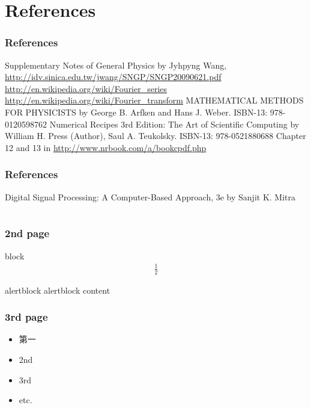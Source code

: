 \documentclass{beamer}
\begin{document}
\section{References}
\begin{frame}
\frametitle{References}
\begin{thebibliography}{7}
 Supplementary Notes of General Physics by Jyhpyng Wang, \url{http://idv.sinica.edu.tw/jwang/SNGP/SNGP20090621.pdf}
 \url{http://en.wikipedia.org/wiki/Fourier_series}
 \url{http://en.wikipedia.org/wiki/Fourier_transform}
 MATHEMATICAL METHODS FOR PHYSICISTS by George B. Arfken and Hans J. Weber. ISBN-13: 978-0120598762
 Numerical Recipes 3rd Edition: The Art of Scientific Computing by William H. Press  (Author), Saul A. Teukolsky. ISBN-13: 978-0521880688
 Chapter 12 and 13 in \url{http://www.nrbook.com/a/bookcpdf.php}
\end{thebibliography}
\end{frame}
\begin{frame}
\frametitle{References}
\begin{thebibliography}{1}
 Digital Signal Processing: A Computer-Based Approach, 3e by Sanjit K. Mitra
\end{thebibliography}
\end{frame}
\section{}
\begin{frame}
\frametitle{2nd page}
\begin{block}{block}
\begin{eqnarray}
\frac{1}{2}
\end{eqnarray}
\end{block}
\begin{alertblock}{alertblock}
alertblock content
\end{alertblock}
\end{frame}
\begin{frame}
\frametitle{3rd page}
\begin{itemize}
\item<1-> 第一
\item<1-> 2nd
\item<2-> 3rd
\item<3-> etc.
\hyperlink{1stpage}{}
\end{itemize}
\end{frame}
\end{document}
